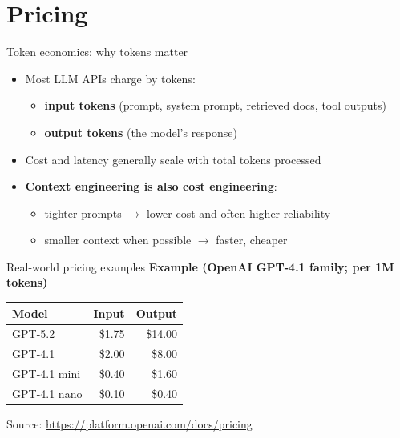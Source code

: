 \documentclass[aspectratio=169]{beamer}
\begin{document}
\section{Pricing}

\begin{frame}{Token economics: why tokens matter}
\begin{itemize}
    \item Most LLM APIs charge by tokens:
    \begin{itemize}
        \item \textbf{input tokens} (prompt, system prompt, retrieved docs, tool outputs)
        \item \textbf{output tokens} (the model's response)
    \end{itemize}
    \item Cost and latency generally scale with total tokens processed
    \item \textbf{Context engineering is also cost engineering}:
    \begin{itemize}
        \item tighter prompts $\rightarrow$ lower cost and often higher reliability
        \item smaller context when possible $\rightarrow$ faster, cheaper
    \end{itemize}
\end{itemize}

\end{frame}

\begin{frame}{Real-world pricing examples}
\textbf{Example (OpenAI GPT-4.1 family; per 1M tokens)}\vspace{0.2cm}

\begin{center}
	

\begin{tabular}{|l|r|r|}
\hline
\textbf{Model} & \textbf{Input} & \textbf{Output} \\
\hline
GPT-5.2 & \$1.75 & \$14.00 \\
GPT-4.1 & \$2.00 & \$8.00 \\
GPT-4.1 mini & \$0.40 & \$1.60 \\
GPT-4.1 nano & \$0.10 & \$0.40 \\
\hline
\end{tabular}
\end{center}

\vspace{0.2cm}
\footnotesize Source: \url{https://platform.openai.com/docs/pricing}
\end{frame}
\end{document}

